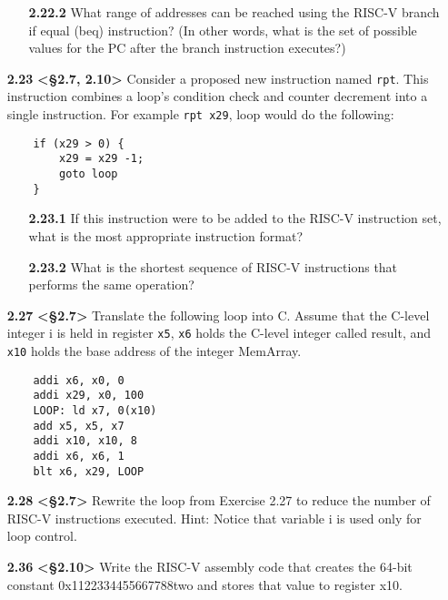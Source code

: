 \documentclass[11pt]{article}
\begin{document}
\begin{enumerate}
\begin{enumerate}
        \item[\textbf{2.22.2}] What range of addresses can be reached using the RISC-V 
        branch if equal (beq) instruction? (In other words, what is the set of possible values 
        for the PC after the branch instruction executes?)
    \end{enumerate}

    \item[\textbf{2.23}] \textbf{<§2.7, 2.10>} Consider a proposed new instruction named \texttt{rpt}. This instruction combines 
    a loop’s condition check and counter decrement into a single instruction. For 
    example \texttt{rpt x29}, loop would do the following:
    \begin{verbatim}
    if (x29 > 0) {
        x29 = x29 -1;
        goto loop
    }
    \end{verbatim}
    
    \begin{enumerate}
        \item[\textbf{2.23.1}] If this instruction were to be added to the RISC-V 
        instruction set, what is the most appropriate instruction format?
        
        \item[\textbf{2.23.2}] What is the shortest sequence of RISC-V instructions that 
        performs the same operation?
    \end{enumerate}
    
    \item[\textbf{2.27}] \textbf{<§2.7>} Translate the following loop into C. Assume that the C-level 
    integer i is held in register \texttt{x5}, \texttt{x6} holds the C-level integer called result, and 
    \texttt{x10} holds the base address of the integer MemArray.
    \begin{verbatim}
    addi x6, x0, 0
    addi x29, x0, 100
    LOOP: ld x7, 0(x10)
    add x5, x5, x7
    addi x10, x10, 8
    addi x6, x6, 1
    blt x6, x29, LOOP
    \end{verbatim}

    \item[\textbf{2.28}] \textbf{<§2.7>} Rewrite the loop from Exercise 2.27 to reduce the number of 
    RISC-V instructions executed. Hint: Notice that variable i is used only for loop 
    control.
    
    \item[\textbf{2.36}] \textbf{<§2.10>} Write the RISC-V assembly code that creates the 64-bit constant 
    0x1122334455667788two and stores that value to register x10.
    

\end{enumerate}
\end{document}
